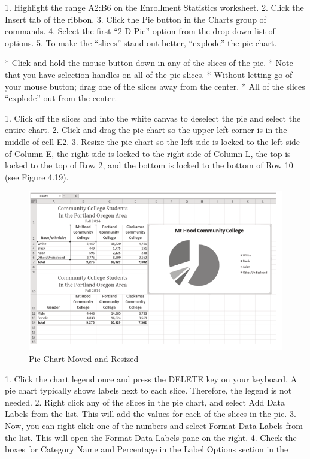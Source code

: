 1.   Highlight the range A2:B6 on the Enrollment Statistics worksheet.
2.   Click the Insert tab of the ribbon.
3.   Click the Pie button in the Charts group of commands.
4.   Select the first “2-D Pie” option from the drop-down list of options.
5.   To make the “slices” stand out better, “explode” the pie chart.

* Click and hold the mouse button down in any of the slices of the pie.
* Note that you have selection handles on all of the pie slices.
* Without letting go of your mouse button; drag one of the slices away from the center.
* All of the slices “explode” out from the center.



1. Click off the slices and into the white canvas to deselect the pie and select the entire chart.
2. Click and drag the pie chart so the upper left corner is in the middle of cell E2.
3. Resize the pie chart so the left side is locked to the left side of Column E, the right side is locked
to the right side of Column L, the top is locked to the top of Row 2, and the bottom is locked to
the bottom of Row 10 (see Figure 4.19).



\begin{figure}[H]
	\centering
	\includegraphics[width=\maxwidth{.95\linewidth}]{gfx/ch04_fig20}
	\caption{Pie Chart Moved and Resized}
	\label{04:fig20}
\end{figure}




1. Click the chart legend once and press the DELETE key on your keyboard. A pie chart typically
shows labels next to each slice. Therefore, the legend is not needed.
2. Right click any of the slices in the pie chart, and select Add Data Labels from the list. This will
add the values for each of the slices in the pie.
3. Now, you can right click one of the numbers and select Format Data Labels from the list. This
will open the Format Data Labels pane on the right.
4. Check the boxes for Category Name and Percentage in the Label Options section in the





